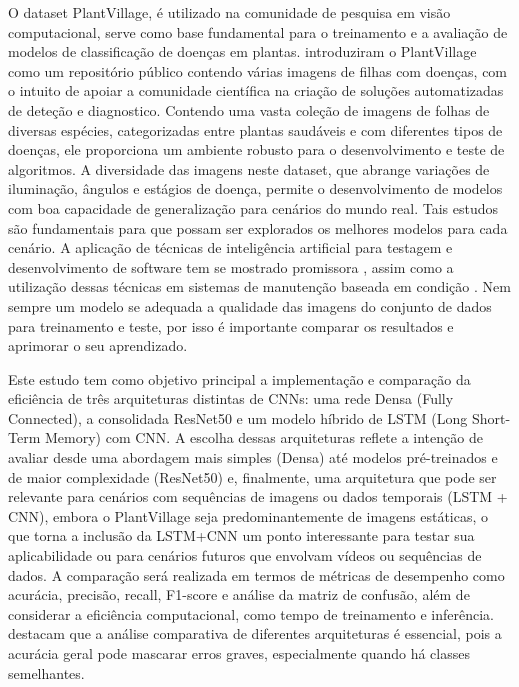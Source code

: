 \documentclass[10pt,conference]{IEEEtran}
\begin{document}
O dataset PlantVillage, é utilizado na comunidade de pesquisa em visão computacional, serve como base fundamental para o treinamento e a avaliação de modelos de classificação de doenças em plantas. \cite{hughes2015open} introduziram o PlantVillage como um repositório público contendo várias imagens de filhas com doenças, com o intuito de apoiar a comunidade científica na criação de soluções automatizadas de deteção e diagnostico. 
Contendo uma vasta coleção de imagens de folhas de diversas espécies, categorizadas entre plantas saudáveis e com diferentes tipos de doenças, ele proporciona um ambiente robusto para o desenvolvimento e teste de algoritmos. A diversidade das imagens neste dataset, que abrange variações de iluminação, ângulos e estágios de doença, permite o desenvolvimento de modelos com boa capacidade de generalização para cenários do mundo real. Tais estudos são fundamentais para que possam ser explorados os melhores modelos para cada cenário. A aplicação de técnicas de inteligência artificial para testagem e desenvolvimento de software tem se mostrado promissora \cite{sales2020analise}, assim como a utilização dessas técnicas em sistemas de manutenção baseada em condição \cite{simeon2008aplicacao}. Nem sempre um modelo se adequada a qualidade das imagens do conjunto de dados para treinamento e teste, por isso é importante comparar os resultados e aprimorar o seu aprendizado.  

Este estudo tem como objetivo principal a implementação e comparação da eficiência de três arquiteturas distintas de CNNs: uma rede Densa (Fully Connected), a consolidada ResNet50 e um modelo híbrido de LSTM (Long Short-Term Memory) com CNN. A escolha dessas arquiteturas reflete a intenção de avaliar desde uma abordagem mais simples (Densa) até modelos pré-treinados e de maior complexidade (ResNet50) e, finalmente, uma arquitetura que pode ser relevante para cenários com sequências de imagens ou dados temporais (LSTM + CNN), embora o PlantVillage seja predominantemente de imagens estáticas, o que torna a inclusão da LSTM+CNN um ponto interessante para testar sua aplicabilidade ou para cenários futuros que envolvam vídeos ou sequências de dados. A comparação será realizada em termos de métricas de desempenho como acurácia, precisão, recall, F1-score e análise da matriz de confusão, além de considerar a eficiência computacional, como tempo de treinamento e inferência. \cite{tessele2024modelo} destacam que a análise comparativa de diferentes arquiteturas é essencial, pois a acurácia geral pode mascarar erros graves, especialmente quando há classes semelhantes. 
\end{document}
